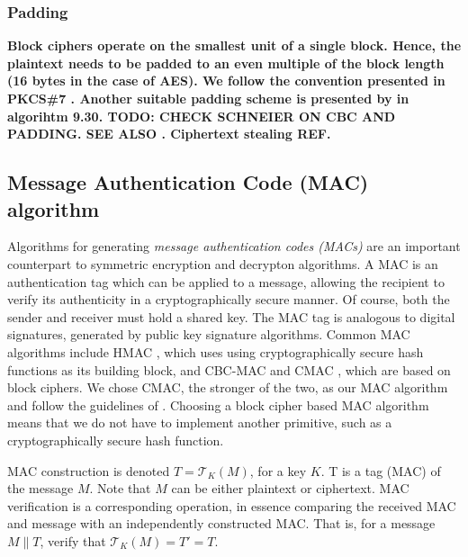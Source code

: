 
\subsubsection{Padding}

\textbf{Block ciphers operate on the smallest unit of a single block. Hence, the plaintext needs to be padded to an even multiple of the block length (16 bytes in the case of AES). We follow the convention presented in PKCS\#7 \cite{RFC-2315-kaliski-1998}. Another suitable padding scheme is presented by  in algorihtm 9.30. \textbf{TODO: CHECK SCHNEIER ON CBC AND PADDING.} \textbf{SEE ALSO \cite[Appendix A]{dworkin2001}.} \textbf{Ciphertext stealing REF. \cite{dworkin2010}}}

\subsection{Message Authentication Code (MAC) algorithm}

Algorithms for generating \textit{message authentication codes (MACs)} are an important counterpart to symmetric encryption and decrypton algorithms. A MAC is an authentication tag which can be applied to a message, allowing the recipient to verify its authenticity in a cryptographically secure manner. Of course, both the sender and receiver must hold a shared key. The MAC tag is analogous to digital signatures, generated by public key signature algorithms. Common MAC algorithms include HMAC \cite{}, which uses using cryptographically secure hash functions as its building block, and CBC-MAC \cite{} and CMAC , which are based on block ciphers. We chose CMAC, the stronger of the two, as our MAC algorithm and follow the guidelines of . Choosing a block cipher based MAC algorithm means that we do not have to implement another primitive, such as a cryptographically secure hash function.

MAC construction is denoted $T=\mathcal{T}_K(M)$, for a key $K$. T is a tag (MAC) of the message $M$. Note that $M$ can be either plaintext or ciphertext.
MAC verification is a corresponding operation, in essence comparing the received MAC and message with an independently constructed MAC. That is, for a message $M \parallel T$, verify that $\mathcal{T}_K(M) = T' = T$.

